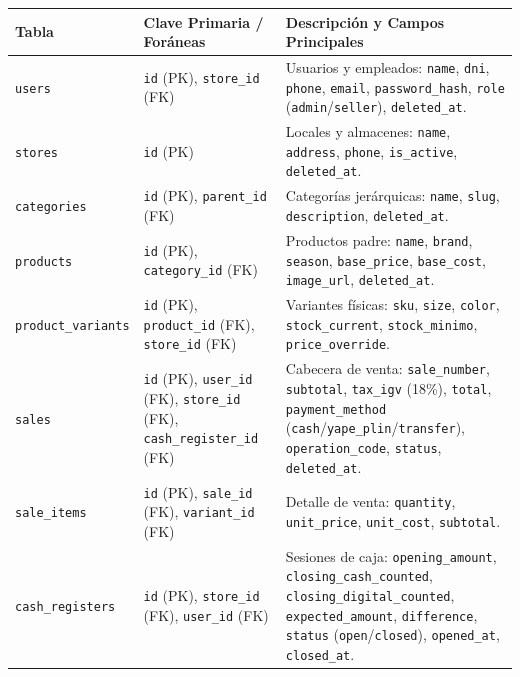 \begin{table}[H]
\centering
\small
\begin{tabularx}{\linewidth}{l>{\raggedright\arraybackslash}p{4cm}>{\raggedright\arraybackslash}X}
\toprule
\rowcolor{LightSlate}
\textbf{Tabla} & \textbf{Clave Primaria / Foráneas} & \textbf{Descripción y Campos Principales} \\
\midrule
\texttt{users} & \texttt{id} (PK), \texttt{store\_id} (FK) & Usuarios y empleados: \texttt{name}, \texttt{dni}, \texttt{phone}, \texttt{email}, \texttt{password\_hash}, \texttt{role} (\texttt{admin}/\texttt{seller}), \texttt{deleted\_at}. \\
\midrule
\texttt{stores} & \texttt{id} (PK) & Locales y almacenes: \texttt{name}, \texttt{address}, \texttt{phone}, \texttt{is\_active}, \texttt{deleted\_at}. \\
\midrule
\texttt{categories} & \texttt{id} (PK), \texttt{parent\_id} (FK) & Categorías jerárquicas: \texttt{name}, \texttt{slug}, \texttt{description}, \texttt{deleted\_at}. \\
\midrule
\texttt{products} & \texttt{id} (PK), \texttt{category\_id} (FK) & Productos padre: \texttt{name}, \texttt{brand}, \texttt{season}, \texttt{base\_price}, \texttt{base\_cost}, \texttt{image\_url}, \texttt{deleted\_at}. \\
\midrule
\texttt{product\_variants} & \texttt{id} (PK), \texttt{product\_id} (FK), \texttt{store\_id} (FK) & Variantes físicas: \texttt{sku}, \texttt{size}, \texttt{color}, \texttt{stock\_current}, \texttt{stock\_minimo}, \texttt{price\_override}. \\
\midrule
\texttt{sales} & \texttt{id} (PK), \texttt{user\_id} (FK), \texttt{store\_id} (FK), \texttt{cash\_register\_id} (FK) & Cabecera de venta: \texttt{sale\_number}, \texttt{subtotal}, \texttt{tax\_igv} (18\%), \texttt{total}, \texttt{payment\_method} (\texttt{cash}/\texttt{yape\_plin}/\texttt{transfer}), \texttt{operation\_code}, \texttt{status}, \texttt{deleted\_at}. \\
\midrule
\texttt{sale\_items} & \texttt{id} (PK), \texttt{sale\_id} (FK), \texttt{variant\_id} (FK) & Detalle de venta: \texttt{quantity}, \texttt{unit\_price}, \texttt{unit\_cost}, \texttt{subtotal}. \\
\midrule
\texttt{cash\_registers} & \texttt{id} (PK), \texttt{store\_id} (FK), \texttt{user\_id} (FK) & Sesiones de caja: \texttt{opening\_amount}, \texttt{closing\_cash\_counted}, \texttt{closing\_digital\_counted}, \texttt{expected\_amount}, \texttt{difference}, \texttt{status} (\texttt{open}/\texttt{closed}), \texttt{opened\_at}, \texttt{closed\_at}. \\

\end{tabularx}
\end{table}
